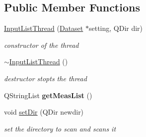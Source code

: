 \subsection*{Public Member Functions}
\begin{CompactItemize}
\item 
\hypertarget{class_input_list_thread_16738682047139388e5920b1fc9c41dd}{
\hyperlink{class_input_list_thread_16738682047139388e5920b1fc9c41dd}{InputListThread} (\hyperlink{class_dataset}{Dataset} $\ast$setting, QDir dir)}
\label{class_input_list_thread_16738682047139388e5920b1fc9c41dd}

\begin{CompactList}\small\item\em constructor of the thread \item\end{CompactList}\item 
\hypertarget{class_input_list_thread_f3d8045a131790ebbec72442183af311}{
\hyperlink{class_input_list_thread_f3d8045a131790ebbec72442183af311}{$\sim$InputListThread} ()}
\label{class_input_list_thread_f3d8045a131790ebbec72442183af311}

\begin{CompactList}\small\item\em destructor stopts the thread \item\end{CompactList}\item 
\hypertarget{class_input_list_thread_395329e5dc6b058b484dd30cc9d7e37f}{
QStringList \textbf{getMeasList} ()}
\label{class_input_list_thread_395329e5dc6b058b484dd30cc9d7e37f}

\item 
\hypertarget{class_input_list_thread_027afb3f352cef38683f2a8983888e45}{
void \hyperlink{class_input_list_thread_027afb3f352cef38683f2a8983888e45}{setDir} (QDir newdir)}
\label{class_input_list_thread_027afb3f352cef38683f2a8983888e45}

\begin{CompactList}\small\item\em set the directory to scan and scans it \item\end{CompactList}\end{CompactItemize}
